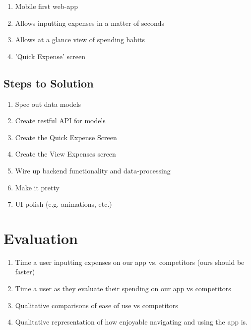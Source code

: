 \documentclass{chi2011}
\begin{document}
\begin{enumerate}
    \item Mobile first web-app
    \item Allows inputting expenses in a matter of seconds
    \item Allows at a glance view of spending habits
    \item 'Quick Expense' screen
\end{enumerate}

\subsection{Steps to Solution}

\begin{enumerate}
    \item Spec out data models
    \item Create restful API for models
    \item Create the Quick Expense Screen
    \item Create the View Expenses screen
    \item Wire up backend functionality and data-processing
    \item Make it pretty
    \item UI polish (e.g. animations, etc.)
\end{enumerate}

\section{Evaluation}

\begin{enumerate}
    \item Time a user inputting expenses on our app vs. competitors (ours should be faster)
    \item Time a user as they evaluate their spending on our app vs competitors
    \item Qualitative comparisons of ease of use vs competitors
    \item Qualitative representation of how enjoyable navigating and using the app is.
\end{enumerate}



\end{document}
